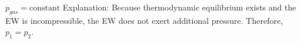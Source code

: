 \( p_{gas} = \text{constant} \)  
Explanation:  
Because thermodynamic equilibrium exists and the EW is incompressible, the EW does not exert additional pressure. Therefore, \( p_1 = p_2 \).